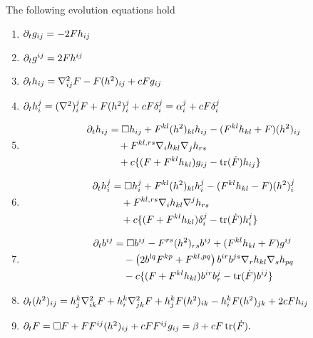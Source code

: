 \documentclass{amsart}
\begin{document}
\begin{lemma}
\label{lem:evolution}
The following evolution equations hold
\begin{enumerate}
\item \label{eq:delt_metric} $\partial_tg_{ij} = -2F h_{ij}$
\item \label{eq:delt_inversemetric} $\partial_t g^{ij} = 2F h^{ij}$
\item \label{eq:delt_sff} $\partial_t h_{ij} = \nabla^2_{ij} F - F(h^2)_{ij} + c F g_{ij}$
\item \label{eq:delt_weingarten} $\partial_t h_i^j = (\nabla^2)^j_iF + F(h^2)_i^j + c F\delta_i^j = \alpha^j_i + c F\delta_i^j$
\item \label{eq:delt_sff_box} \begin{align*}
\partial_t h_{ij} &= \Box h_{ij} + F^{kl} (h^2)_{kl} h_{ij} - (F^{kl}h_{kl} + F) (h^2)_{ij} \\
& \quad + F^{kl,rs}\nabla_i h_{kl}\nabla_j h_{rs} \\
& \quad + c \{(F + F^{kl}h_{kl}) g_{ij} - \operatorname{tr}(\dot{F}) h_{ij}\}
\end{align*}
\item \label{eq:delt_weingarten_box} \begin{align*}
\partial_t h_i^j &= \Box h_i^j + F^{kl} (h^2)_{kl} h_i^j - (F^{kl}h_{kl} - F) (h^2)_i^j \\
& \quad + F^{kl,rs}\nabla_i h_{kl}\nabla^j h_{rs} \\
& \quad + c \{(F + F^{kl}h_{kl}) \delta_i^j - \operatorname{tr}(\dot{F}) h_i^j\}
\end{align*}
\item \label{eq:delt_inversesff} \begin{align*}
\partial_t b^{ij} &= \Box b^{ij} - F^{rs} (h^2)_{rs} b^{ij} + (F^{kl}h_{kl} + F) g^{ij} \\
& \quad - \left(2b^{lq}F^{kp} + F^{kl,pq}\right) b^{ir}b^{js} \nabla_r h_{kl} \nabla_s h_{pq} \\
& \quad - c \{(F + F^{kl}h_{kl}) b^{ir}b^{j}_{r} - \operatorname{tr}(\dot{F}) b^{ij}\}
\end{align*}
\item \label{eq:delt_squaredsff} $\partial_t (h^2)_{ij} = h^k_j \nabla^2_{ik} F + h^k_i \nabla^2_{jk} F + h^k_j F(h^2)_{ik} - h^k_i F(h^2)_{jk} + 2cF h_{ij}$
\item \label{eq:delt_speed} $\partial_t F = \Box F + FF^{ij}(h^2)_{ij} + c FF^{ij}g_{ij} = \beta + cF\operatorname{tr}(\dot{F}).$
\end{enumerate}
\end{lemma}
\end{document}
